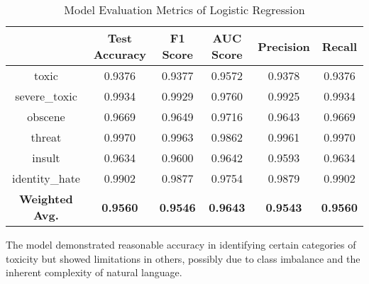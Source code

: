     
\begin{table}[h]
\centering
\begin{tabular}{|c|c|c|c|c|c|}
\hline
 & Test Accuracy & F1 Score & AUC Score & Precision & Recall \\
\hline
toxic & 0.9376 & 0.9377 & 0.9572 & 0.9378 & 0.9376 \\
severe\_toxic & 0.9934 & 0.9929 & 0.9760 & 0.9925 & 0.9934 \\
obscene & 0.9669 & 0.9649 & 0.9716 & 0.9643 & 0.9669 \\
threat & 0.9970 & 0.9963 & 0.9862 & 0.9961 & 0.9970 \\
insult & 0.9634 & 0.9600 & 0.9642 & 0.9593 & 0.9634 \\
identity\_hate & 0.9902 & 0.9877 & 0.9754 & 0.9879 & 0.9902 \\
\hline
\textbf{Weighted Avg.} & \textbf{0.9560} & \textbf{0.9546} & \textbf{0.9643} & \textbf{0.9543} & \textbf{0.9560} \\
\hline
\end{tabular}
\caption{Model Evaluation Metrics of Logistic Regression}
\label{tab:model_metrics}
\end{table}


The model demonstrated reasonable accuracy in identifying certain categories of toxicity but showed limitations in others, possibly due to class imbalance and the inherent complexity of natural language.

